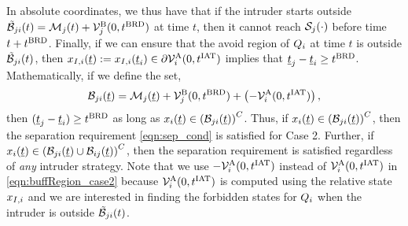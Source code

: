 In absolute coordinates, we thus have that if the intruder starts outside $\tilde{\mathcal{B}}_{ji}(t) = \mathcal{M}_j(t) + \mathcal{V}^{\text{B}}_{j}(0, t^\text{BRD})$ at time $t$, then it cannot reach $\mathcal{S}_j(\cdot)$ before time $t + t^\text{BRD}$. Finally, if we can ensure that the avoid region of $Q_i$ at time $t$ is outside $\tilde{\mathcal{B}}_{ji}(t)$, then $x_{I, i}(\underline{t}) := x_{I, i}(\underline{t}_i) \in \partial \mathcal{V}^{\text{A}}_{i}(0, t^\text{IAT})$ implies that $\underline{t}_j - \underline{t}_i \geq t^\text{BRD}$. Mathematically, if we define the set,  
\begin{equation} \label{eqn:buffRegion_case2}
\buff_{ji}(\tsa) = \boset_j(\tsa) + \brs^{\text{B}}_{j}(0, \brd) + \left(-\brs^{\text{A}}_{i}(0, \iat)\right),
\end{equation} 
then $(\underline{t}_j - \underline{t}_i) \geq t^\text{BRD}$ as long as $x_i(\underline{t}) \in \left(\mathcal{B}_{ji}(\underline{t})\right)^C$. Thus, if $x_i(\underline{t}) \in \left(\mathcal{B}_{ji}(\underline{t})\right)^C$, then the separation requirement \eqref{eqn:sep_cond} is satisfied for Case 2. Further, if $x_i(\underline{t}) \in \left(\mathcal{B}_{ji}(\underline{t}) \cup \mathcal{B}_{ij}(\underline{t})\right)^C$, then the separation requirement is satisfied regardless of \textit{any} intruder strategy. Note that we use $-\mathcal{V}^{\text{A}}_{i}(0, t^\text{IAT})$ instead of $\mathcal{V}^{\text{A}}_{i}(0, t^\text{IAT})$ in \eqref{eqn:buffRegion_case2} because $\mathcal{V}^{\text{A}}_{i}(0, t^\text{IAT})$ is computed using the relative state $x_{I, i}$ and we are interested in finding the forbidden states for $Q_i$ when the intruder is outside $\tilde{\mathcal{B}}_{ji}(t)$.